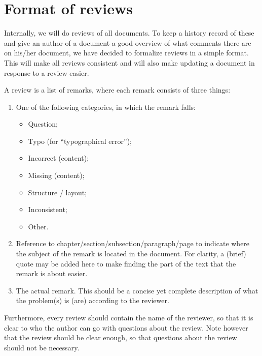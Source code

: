 \chapter{Format of reviews}\label{format review}
Internally, we will do reviews of all documents. To keep a history record of these and give an author of a document a good overview of what comments there are on his/her document, we have decided to formalize reviews in a simple format. This will make all reviews consistent and will also make updating a document in response to a review easier.

A review is a list of remarks, where each remark consists of three things:
\begin{enumerate}
	\item One of the following categories, in which the remark falls:
		\begin{itemize}
			\item Question;
			\item Typo (for ``typographical error'');
			\item Incorrect (content);
			\item Missing (content);
			\item Structure / layout;
			\item Inconsistent;
			\item Other.
		\end{itemize}
	\item Reference to chapter/section/subsection/paragraph/page to indicate where the subject of the remark is located in the document. For clarity, a (brief) quote may be added here to make finding the part of the text that the remark is about easier.
	\item The actual remark. This should be a concise yet complete description of what the problem(s) is (are) according to the reviewer.
\end{enumerate}

Furthermore, every review should contain the name of the reviewer, so that it is clear to who the author can go with questions about the review. Note however that the review should be clear enough, so that questions about the review should not be necessary.
